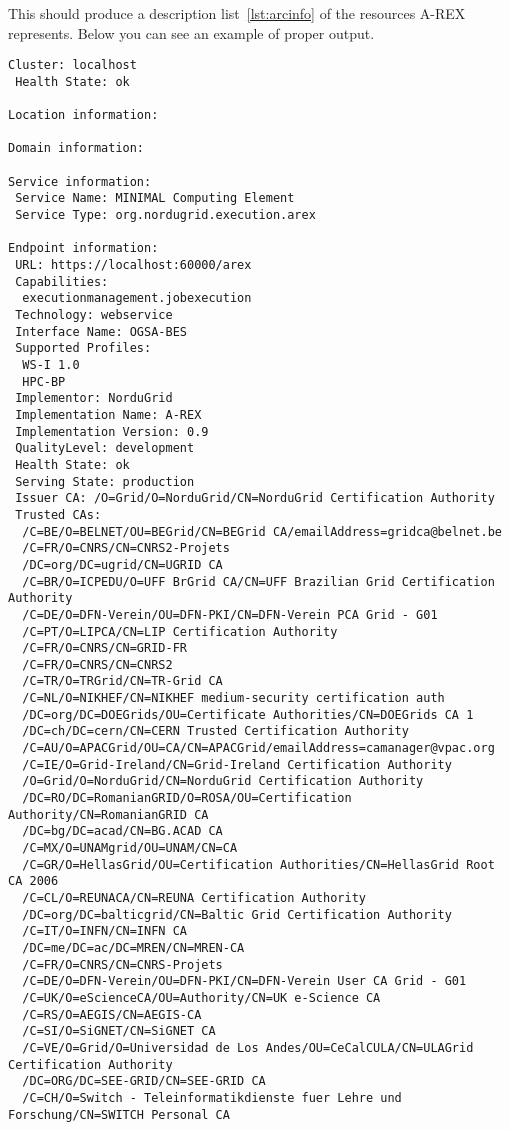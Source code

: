 \documentclass{article}                            %
\begin{document}
This should produce a description list~\ref{lst:arcinfo} of the resources A-REX
represents. Below you can see an example of proper output.

\begin{lstlisting}[caption={Example of proper arcinfo output},label=lst:arcinfo]
Cluster: localhost
 Health State: ok

Location information:

Domain information:

Service information:
 Service Name: MINIMAL Computing Element
 Service Type: org.nordugrid.execution.arex

Endpoint information:
 URL: https://localhost:60000/arex
 Capabilities:
  executionmanagement.jobexecution
 Technology: webservice
 Interface Name: OGSA-BES
 Supported Profiles:
  WS-I 1.0
  HPC-BP
 Implementor: NorduGrid
 Implementation Name: A-REX
 Implementation Version: 0.9
 QualityLevel: development
 Health State: ok
 Serving State: production
 Issuer CA: /O=Grid/O=NorduGrid/CN=NorduGrid Certification Authority
 Trusted CAs:
  /C=BE/O=BELNET/OU=BEGrid/CN=BEGrid CA/emailAddress=gridca@belnet.be
  /C=FR/O=CNRS/CN=CNRS2-Projets
  /DC=org/DC=ugrid/CN=UGRID CA
  /C=BR/O=ICPEDU/O=UFF BrGrid CA/CN=UFF Brazilian Grid Certification Authority
  /C=DE/O=DFN-Verein/OU=DFN-PKI/CN=DFN-Verein PCA Grid - G01
  /C=PT/O=LIPCA/CN=LIP Certification Authority
  /C=FR/O=CNRS/CN=GRID-FR
  /C=FR/O=CNRS/CN=CNRS2
  /C=TR/O=TRGrid/CN=TR-Grid CA
  /C=NL/O=NIKHEF/CN=NIKHEF medium-security certification auth
  /DC=org/DC=DOEGrids/OU=Certificate Authorities/CN=DOEGrids CA 1
  /DC=ch/DC=cern/CN=CERN Trusted Certification Authority
  /C=AU/O=APACGrid/OU=CA/CN=APACGrid/emailAddress=camanager@vpac.org
  /C=IE/O=Grid-Ireland/CN=Grid-Ireland Certification Authority
  /O=Grid/O=NorduGrid/CN=NorduGrid Certification Authority
  /DC=RO/DC=RomanianGRID/O=ROSA/OU=Certification Authority/CN=RomanianGRID CA
  /DC=bg/DC=acad/CN=BG.ACAD CA
  /C=MX/O=UNAMgrid/OU=UNAM/CN=CA
  /C=GR/O=HellasGrid/OU=Certification Authorities/CN=HellasGrid Root CA 2006
  /C=CL/O=REUNACA/CN=REUNA Certification Authority
  /DC=org/DC=balticgrid/CN=Baltic Grid Certification Authority
  /C=IT/O=INFN/CN=INFN CA
  /DC=me/DC=ac/DC=MREN/CN=MREN-CA
  /C=FR/O=CNRS/CN=CNRS-Projets
  /C=DE/O=DFN-Verein/OU=DFN-PKI/CN=DFN-Verein User CA Grid - G01
  /C=UK/O=eScienceCA/OU=Authority/CN=UK e-Science CA
  /C=RS/O=AEGIS/CN=AEGIS-CA
  /C=SI/O=SiGNET/CN=SiGNET CA
  /C=VE/O=Grid/O=Universidad de Los Andes/OU=CeCalCULA/CN=ULAGrid Certification Authority
  /DC=ORG/DC=SEE-GRID/CN=SEE-GRID CA
  /C=CH/O=Switch - Teleinformatikdienste fuer Lehre und Forschung/CN=SWITCH Personal CA

\end{lstlisting}
\end{document}

